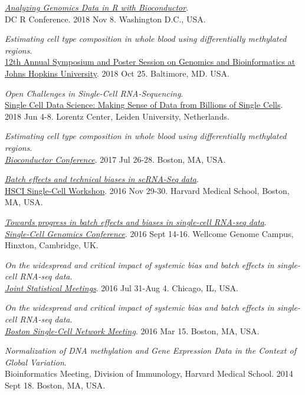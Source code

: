 \documentclass[10pt]{article}
\begin{document}
\item 
{\it \href{https://speakerdeck.com/stephaniehicks/analyzing-genomics-data-in-r-with-bioconductor}{Analyzing Genomics Data in R with Bioconductor}}. \\
DC R Conference. 2018 Nov 8. Washington D.C., USA.
\item 
{\it Estimating cell type composition in whole blood using differentially methylated regions}. \\
\href{http://genomics.jhu.edu/symposium.html}{12th Annual Symposium and Poster Session on Genomics and Bioinformatics at Johns Hopkins University}. 2018 Oct 25. Baltimore, MD. USA.
\item 
{\it Open Challenges in Single-Cell RNA-Sequencing}. \\ 
\href{http://lorentzcenter.nl/lc/web/2018/986/info.php3?wsid=986&venue=Oort}{Single Cell Data Science: Making Sense of Data from Billions of Single Cells}. 2018 Jun 4-8. Lorentz Center, Leiden University, Netherlands.
\item 
{\it Estimating cell type composition in whole blood using differentially methylated regions}. \\
\href{http://bioconductor.org/help/course-materials/2017/BioC2017/}{{\it Bioconductor Conference}}. 2017 Jul 26-28. Boston, MA, USA.
\item 
{\it \href{https://github.com/hms-dbmi/scw/tree/master/scw2016/tutorials/batcheffects}{Batch effects and technical biases in scRNA-Seq data}}. \\ 
\href{http://hsci.harvard.edu/event/save-date-single-cell-analysis-workshop}{HSCI Single-Cell Workshop}. 2016 Nov 29-30. Harvard Medical School, Boston, MA, USA.
\item
{\it \href{https://speakerdeck.com/stephaniehicks/towards-progress-in-batch-effects-and-biases-in-single-cell-rna-seq-data}{Towards progress in batch effects and biases in single-cell RNA-seq data}}. \\
\href{https://coursesandconferences.wellcomegenomecampus.org/events/item.aspx?e=596}{{\it Single-Cell Genomics Conference}}. 2016 Sept 14-16. Wellcome Genome Campus, Hinxton, Cambridge, UK.
\item
{\it On the widespread and critical impact of systemic bias and batch effects in single-cell RNA-seq data}. \\
\href{https://www.amstat.org/meetings/jsm/2016/onlineprogram/MainSearchResults.cfm}{{\it Joint Statistical Meetings}}. 2016 Jul 31-Aug 4. Chicago, IL, USA.
\item
{\it On the widespread and critical impact of systemic bias and batch effects in single-cell RNA-seq data}. \\
\href{http://hsci.harvard.edu/event/widespread-and-critical-impact-systemic-bias-and-batch-effects-single-cell-rna-seq-data?delta=0}{{\it Boston Single-Cell Network Meeting}}. 2016 Mar 15. Boston, MA, USA.
\item 
{\it Normalization of DNA methylation and Gene Expression Data in the Context of Global Variation}. \\
Bioinformatics Meeting, Division of Immunology, Harvard Medical School. 2014 Sept 18. Boston, MA, USA.
\end{document}
